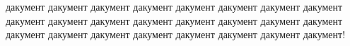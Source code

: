 \documentclass[a4paper]{article}
\begin{document}

дакумент дакумент дакумент дакумент дакумент дакумент дакумент дакумент дакумент дакумент дакумент дакумент дакумент дакумент дакумент дакумент дакумент дакумент дакумент дакумент дакумент дакумент дакумент дакумент! 
\end{document}
